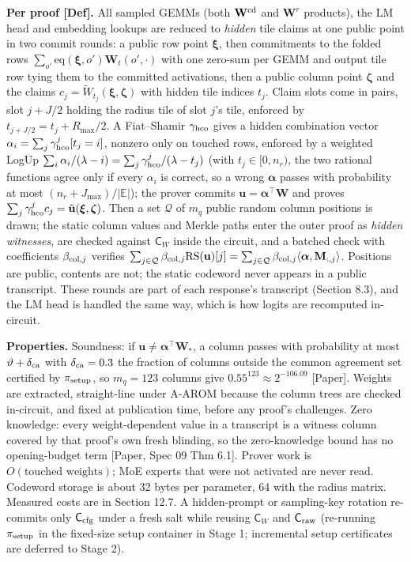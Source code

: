 \documentclass[10pt]{article}
\begin{document}
\textbf{Per proof [Def].} All sampled GEMMs (both $\mathbf W^{\rm cd}$ and $\mathbf W^r$ products), the LM head and embedding lookups are reduced to \emph{hidden} tile claims at one public point in two commit rounds: a public row point $\boldsymbol\xi$, then commitments to the folded rows $\sum_{o'}\mathrm{eq}(\boldsymbol\xi,o')\mathbf W_t(o',\cdot)$ with one zero-sum per GEMM and output tile row tying them to the committed activations, then a public column point $\boldsymbol\zeta$ and the claims $c_j=\widetilde W_{t_j}(\boldsymbol\xi,\boldsymbol\zeta)$ with hidden tile indices $t_j$. Claim slots come in pairs, slot $j+J/2$ holding the radius tile of slot $j$'s tile, enforced by $t_{j+J/2}=t_j+R_{\max}/2$. A Fiat--Shamir $\gamma_{\rm hco}$ gives a hidden combination vector $\alpha_i=\sum_j\gamma_{\rm hco}^j[t_j=i]$, nonzero only on touched rows, enforced by a weighted LogUp $\sum_i\alpha_i/(\lambda-i)=\sum_j\gamma_{\rm hco}^j/(\lambda-t_j)$ (with $t_j\in[0,n_r)$, the two rational functions agree only if every $\alpha_i$ is correct, so a wrong $\boldsymbol\alpha$ passes with probability at most $(n_r+J_{\max})/\lvert\mathbb E\rvert$); the prover commits $\mathbf u=\boldsymbol\alpha^\top\mathbf W$ and proves $\sum_j\gamma_{\rm hco}^jc_j=\tilde{\mathbf u}(\boldsymbol\xi,\boldsymbol\zeta)$. Then a set $\mathcal Q$ of $m_q$ public random column positions is drawn; the static column values and Merkle paths enter the outer proof as \emph{hidden witnesses}, are checked against $\mathsf C_W$ inside the circuit, and a batched check with coefficients $\beta_{{\rm col},j}$ verifies $\sum_{j\in\mathcal Q}\beta_{{\rm col},j}\mathrm{RS}(\mathbf u)[j]=\sum_{j\in\mathcal Q}\beta_{{\rm col},j}\langle\boldsymbol\alpha,\mathbf M_{:,j}\rangle$. Positions are public, contents are not; the static codeword never appears in a public transcript. These rounds are part of each response's transcript (Section 8.3), and the LM head is handled the same way, which is how logits are recomputed in-circuit.

\textbf{Properties.} Soundness: if $\mathbf u\neq\boldsymbol\alpha^\top\mathbf W_*$, a column passes with probability at most $\vartheta+\delta_{\rm ca}$ with $\delta_{\rm ca}=0.3$ the fraction of columns outside the common agreement set certified by $\pi_{\rm setup}$, so $m_q=123$ columns give $0.55^{123}\approx2^{-106.09}$ [Paper]. Weights are extracted, straight-line under A-AROM because the column trees are checked in-circuit, and fixed at publication time, before any proof's challenges. Zero knowledge: every weight-dependent value in a transcript is a witness column covered by that proof's own fresh blinding, so the zero-knowledge bound has no opening-budget term [Paper, Spec 09 Thm 6.1]. Prover work is $O(\text{touched weights})$; MoE experts that were not activated are never read. Codeword storage is about 32 bytes per parameter, 64 with the radius matrix. Measured costs are in Section 12.7. A hidden-prompt or sampling-key rotation re-commits only $\mathsf C_{\rm cfg}$ under a fresh salt while reusing $\mathsf C_W$ and $\mathsf C_{\rm raw}$ (re-running $\pi_{\rm setup}$ in the fixed-size setup container in Stage 1; incremental setup certificates are deferred to Stage 2).
\end{document}
